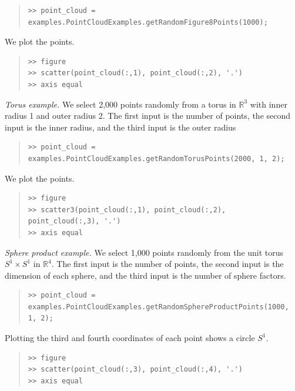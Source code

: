 \documentclass[amscd, amssymb, verbatim]{amsart}[12pt]
\theoremstyle{remark}
\theoremstyle{remark}
\theoremstyle{remark}
\begin{document}
\begin{quote} \begin{verbatim}
>> point_cloud = examples.PointCloudExamples.getRandomFigure8Points(1000);
\end{verbatim} \end{quote}

We plot the points.

\begin{quote} \begin{verbatim}
>> figure
>> scatter(point_cloud(:,1), point_cloud(:,2), '.')
>> axis equal
\end{verbatim} \end{quote}

{\em Torus example.} We select 2,000 points randomly from a torus in $\mathbb{R}^3$ with inner radius 1 and outer radius 2. The first input is the number of points, the second input is the inner radius, and the third input is the outer radius

\begin{quote} \begin{verbatim}
>> point_cloud = examples.PointCloudExamples.getRandomTorusPoints(2000, 1, 2);
\end{verbatim} \end{quote}

We plot the points.

\begin{quote} \begin{verbatim}
>> figure
>> scatter3(point_cloud(:,1), point_cloud(:,2), point_cloud(:,3), '.')
>> axis equal
\end{verbatim} \end{quote}

{\em Sphere product example.} We select 1,000 points randomly from the unit torus $S^1 \times S^1$ in $\mathbb{R}^4$. The first input is the number of points, the second input is the dimension of each sphere, and the third input is the number of sphere factors.

\begin{quote} \begin{verbatim}
>> point_cloud = examples.PointCloudExamples.getRandomSphereProductPoints(1000, 1, 2);
\end{verbatim} \end{quote}

Plotting the third and fourth coordinates of each point shows a circle $S^1$.

\begin{quote} \begin{verbatim}
>> figure
>> scatter(point_cloud(:,3), point_cloud(:,4), '.')
>> axis equal
\end{verbatim} \end{quote}
\end{document}
